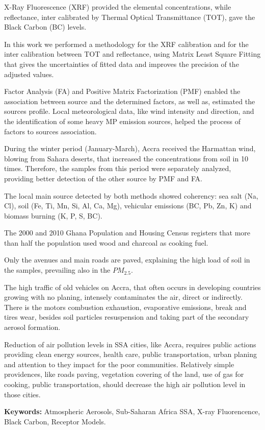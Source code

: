 X-Ray Fluorescence (XRF) provided the elemental concentrations, while 
reflectance, inter calibrated by Thermal Optical Transmittance (TOT), gave the Black 
Carbon (BC) levels. 

In this work we performed a methodology for the XRF calibration and for 
the inter calibration between TOT and reflectance, using Matrix Least Square Fitting that gives the uncertainties of 
fitted data and improves the precision of the adjusted values.

Factor Analysis (FA) and Positive Matrix Factorization (PMF) 
enabled the association between source and the determined factors, 
as well as, estimated the sources profile. Local meteorological data, like wind intensity and direction, 
and the identification of some heavy MP emission sources, 
helped the process of factors to sources association. 

During the winter period (January-March), Accra received the 
Harmattan wind, blowing from Sahara deserts, that increased
the concentrations from soil in 10 times. Therefore, the samples from 
this period were separately analyzed, providing better detection 
of the other source by PMF and FA.

The local main source detected by both methods showed coherency: 
sea salt (Na, Cl), soil (Fe, Ti, Mn, Si, Al, Ca, Mg), 
vehicular emissions (BC, Pb, Zn, K) and biomass burning (K, P, S, BC).

The 2000 and 2010 Ghana Population and Housing Census registers 
that more than half the population used wood and charcoal as cooking fuel. 

Only the avenues and main roads are paved, explaining the high 
load of soil in the samples, prevailing also in the $PM_{2.5}$.

The high traffic of old vehicles on Accra, that often occurs in developing countries growing with no planing, intensely contaminates the air, direct or indirectly. There is the motors combustion exhaustion, evaporative emissions, break and tires wear, besides soil particles resuspension and taking part of the secondary aerosol formation.

Reduction of air pollution levels in SSA cities, like Accra, 
requires public actions providing clean energy sources, health care, 
public transportation, urban planing and attention to they impact for 
the poor communities. Relatively simple providences, like roads paving, vegetation 
covering of the land, use of gas for cooking, public transportation, 
should decrease the high air pollution level in those cities.

\par
\vspace{1em}
\noindent\textbf{Keywords:} Atmospheric Aerosols, Sub-Saharan Africa SSA,
X-ray Fluorencence, Black Carbon, Receptor Models.

